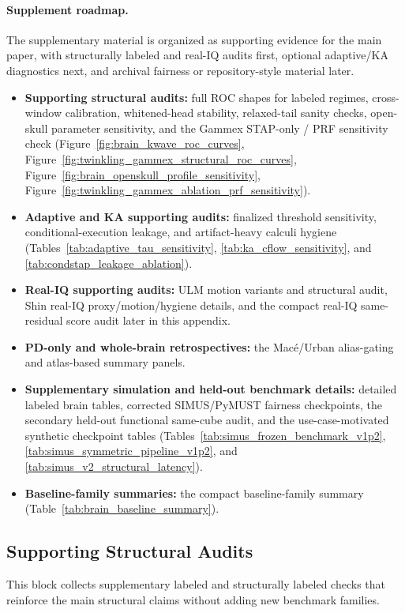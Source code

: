 \paragraph{Supplement roadmap.}
\noindent The supplementary material is organized as supporting evidence for the main paper, with structurally labeled and real-IQ audits first, optional adaptive/KA diagnostics next, and archival fairness or repository-style material later.
\begin{itemize}[nosep]
  \item \textbf{Supporting structural audits:} full ROC shapes for labeled regimes, cross-window calibration, whitened-head stability, relaxed-tail sanity checks, open-skull parameter sensitivity, and the Gammex STAP-only / PRF sensitivity check (Figure~\ref{fig:brain_kwave_roc_curves}, Figure~\ref{fig:twinkling_gammex_structural_roc_curves}, Figure~\ref{fig:brain_openskull_profile_sensitivity}, Figure~\ref{fig:twinkling_gammex_ablation_prf_sensitivity}).
  \item \textbf{Adaptive and KA supporting audits:} finalized threshold sensitivity, conditional-execution leakage, and artifact-heavy calculi hygiene (Tables~\ref{tab:adaptive_tau_sensitivity}, \ref{tab:ka_cflow_sensitivity}, and \ref{tab:condstap_leakage_ablation}).
  \item \textbf{Real-IQ supporting audits:} ULM motion variants and structural audit, Shin real-IQ proxy/motion/hygiene details, and the compact real-IQ same-residual score audit later in this appendix.
  \item \textbf{PD-only and whole-brain retrospectives:} the Mac{\'e}/Urban alias-gating and atlas-based summary panels.
  \item \textbf{Supplementary simulation and held-out benchmark details:} detailed labeled brain tables, corrected SIMUS/PyMUST fairness checkpoints, the secondary held-out functional same-cube audit, and the use-case-motivated synthetic checkpoint tables (Tables~\ref{tab:simus_frozen_benchmark_v1p2}, \ref{tab:simus_symmetric_pipeline_v1p2}, and \ref{tab:simus_v2_structural_latency}).
  \item \textbf{Baseline-family summaries:} the compact baseline-family summary (Table~\ref{tab:brain_baseline_summary}).
\end{itemize}

\subsection*{Supporting Structural Audits}
This block collects supplementary labeled and structurally labeled checks that reinforce the main structural claims without adding new benchmark families.

